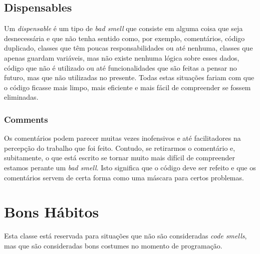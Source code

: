 

\subsection{Dispensables}

\hspace{5mm} Um \textit{dispensable} é um tipo de \textit{bad smell} que consiste em alguma coisa que seja desnecessária e que não tenha sentido como, por exemplo, comentários, código duplicado, classes que têm poucas responsabilidades ou até nenhuma, classes que apenas guardam variáveis, mas não existe nenhuma lógica sobre esses dados, código que não é utilizado ou até funcionalidades que são feitas a pensar no futuro, mas que não utilizadas no presente. Todas estas situações fariam com que o código ficasse mais limpo, mais eficiente e mais fácil de compreender se fossem eliminadas.

\subsubsection{Comments}

\hspace{5mm} Os comentários podem parecer muitas vezes inofensivos e até facilitadores na percepção do trabalho que foi feito. Contudo, se retirarmos o comentário e, subitamente, o que está escrito se tornar muito mais difícil de compreender estamos perante um \textit{bad smell}. Isto significa que o código deve ser refeito e que os comentários servem de certa forma como uma máscara para certos problemas.



\section{Bons Hábitos}

\hspace{5mm} Esta classe está reservada para situações que não são consideradas \textit{code smells}, mas que são consideradas bons costumes no momento de programação.


